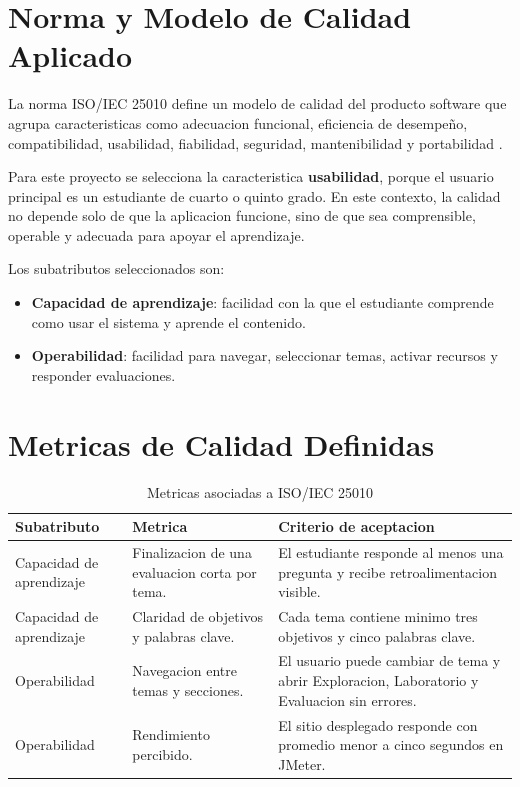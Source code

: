 \documentclass[man,12pt]{apa7}
\begin{document}
\section{Norma y Modelo de Calidad Aplicado}

La norma ISO/IEC 25010 define un modelo de calidad del producto software que agrupa caracteristicas como adecuacion funcional, eficiencia de desempeño, compatibilidad, usabilidad, fiabilidad, seguridad, mantenibilidad y portabilidad \parencite{iso25010}.

Para este proyecto se selecciona la caracteristica \textbf{usabilidad}, porque el usuario principal es un estudiante de cuarto o quinto grado. En este contexto, la calidad no depende solo de que la aplicacion funcione, sino de que sea comprensible, operable y adecuada para apoyar el aprendizaje.

Los subatributos seleccionados son:

\begin{itemize}
  \item \textbf{Capacidad de aprendizaje}: facilidad con la que el estudiante comprende como usar el sistema y aprende el contenido.
  \item \textbf{Operabilidad}: facilidad para navegar, seleccionar temas, activar recursos y responder evaluaciones.
\end{itemize}

\section{Metricas de Calidad Definidas}

\begin{table}[H]
\centering
\caption{Metricas asociadas a ISO/IEC 25010}
\label{tab:metricas}
\begin{tabular}{p{3cm}p{4.2cm}p{4.8cm}}
\toprule
\textbf{Subatributo} & \textbf{Metrica} & \textbf{Criterio de aceptacion} \\
\midrule
Capacidad de aprendizaje & Finalizacion de una evaluacion corta por tema. & El estudiante responde al menos una pregunta y recibe retroalimentacion visible. \\
Capacidad de aprendizaje & Claridad de objetivos y palabras clave. & Cada tema contiene minimo tres objetivos y cinco palabras clave. \\
Operabilidad & Navegacion entre temas y secciones. & El usuario puede cambiar de tema y abrir Exploracion, Laboratorio y Evaluacion sin errores. \\
Operabilidad & Rendimiento percibido. & El sitio desplegado responde con promedio menor a cinco segundos en JMeter. \\
\bottomrule
\end{tabular}
\end{table}
\end{document}
